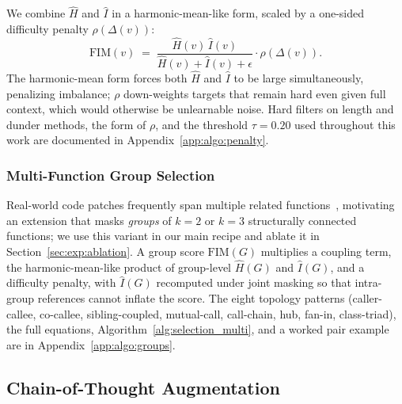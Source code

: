 We combine $\hat{H}$ and $\hat{I}$ in a harmonic-mean-like form, scaled
by a one-sided difficulty penalty $\rho(\Delta(v))$:
\vspace{-0.5ex}
\begin{equation}
  \mathrm{FIM}(v) \;=\;
  \frac{\hat{H}(v)\,\hat{I}(v)}{\hat{H}(v) + \hat{I}(v) + \epsilon}
  \cdot \rho\!\left(\Delta(v)\right).
  \label{eq:fim_single}
\end{equation}
The harmonic-mean form forces both $\hat{H}$ and $\hat{I}$ to be large
simultaneously, penalizing imbalance; $\rho$ down-weights targets that
remain hard even given full context, which would otherwise be
unlearnable noise. Hard filters on length and dunder methods, the form
of $\rho$, and the threshold $\tau\!=\!0.20$ used throughout this work
are documented in Appendix~\ref{app:algo:penalty}.

\subsubsection{Multi-Function Group Selection}
\label{sec:method:groups}

Real-world code patches frequently span multiple related
functions~\citep{swebench}, motivating an extension that masks
\emph{groups} of $k\!=\!2$ or $k\!=\!3$ structurally connected functions;
we use this variant in our main recipe and ablate it in
Section~\ref{sec:exp:ablation}. A group score $\mathrm{FIM}(G)$
multiplies a coupling term, the harmonic-mean-like product of
group-level $\hat{H}(G)$ and $\hat{I}(G)$, and a difficulty penalty,
with $\hat{I}(G)$ recomputed under joint masking so that intra-group
references cannot inflate the score. The eight topology patterns
(caller-callee, co-callee, sibling-coupled, mutual-call, call-chain,
hub, fan-in, class-triad), the full equations,
Algorithm~\ref{alg:selection_multi}, and a worked pair example are in
Appendix~\ref{app:algo:groups}.

\vspace{-0.5ex}
\subsection{Chain-of-Thought Augmentation}
\label{sec:method:cot}

